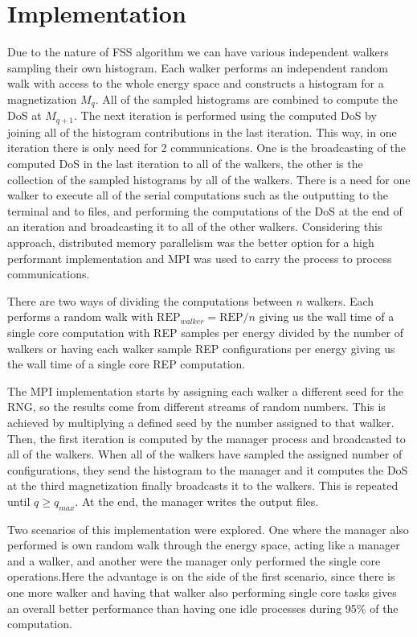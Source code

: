 \section{Implementation}

	Due to the nature of FSS algorithm we can have various independent walkers sampling their own histogram. Each walker performs an independent random walk with access to the whole energy space and constructs a histogram for a magnetization $M_q$. All of the sampled histograms are combined to compute the DoS at $M_{q+1}$. The next iteration is performed using the computed DoS by joining all of the histogram contributions in the last iteration.
This way, in one iteration there is only need for 2 communications. One is the broadcasting of the computed DoS in the last iteration to all of the walkers, the other is the collection of the sampled histograms by all of the walkers. There is a need for one walker to execute all of the serial computations such as the outputting to the terminal and to files, and performing the computations of the DoS at the end of an iteration and broadcasting it to all of the other walkers. Considering this approach, distributed memory parallelism was the better option for a high performant implementation and MPI was used to carry the process to process communications.

	There are two ways of dividing the computations between $n$ walkers. Each performs a random walk with $\text{REP}_{walker} = \text{REP} / n$ giving us the wall time of a single core computation with REP samples per energy divided by the number of walkers or having each walker sample REP configurations per energy giving us the wall time of a single core REP computation.
	
	The MPI implementation starts by assigning each walker a different seed for the RNG, so the results come from different streams of random numbers. This is achieved by multiplying a defined seed by the number assigned to that walker. Then, the first iteration is computed by the manager process and broadcasted to all of the walkers. When all of the walkers have sampled the assigned number of configurations, they send the histogram to the manager and it computes the DoS at the third magnetization finally broadcasts it to the walkers. This is repeated until $q \geqslant q_{max}$. At the end, the manager writes the output files.
 
	Two scenarios of this implementation were explored. One where the manager also performed is own random walk through the energy space, acting like a manager and a walker, and another were the manager only performed the single core operations.Here the advantage is on the side of the first scenario, since there is one more walker and having that walker also performing single core tasks gives an overall better performance than having one idle processes during 95\% of the computation.


